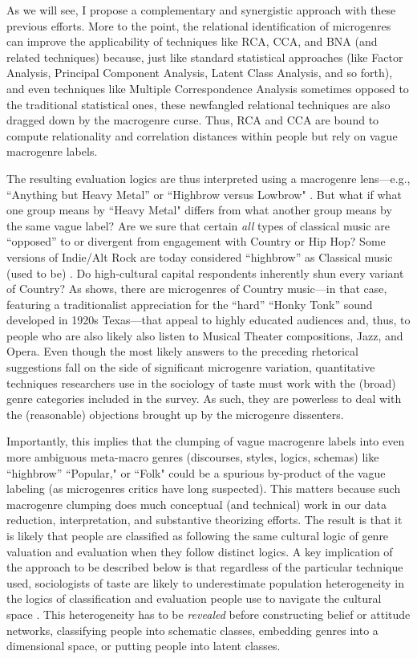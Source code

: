 \documentclass[a4paper,12pt]{extarticle}
\begin{document}
As we will see, I propose a complementary and synergistic approach with these previous efforts. More to the point, the relational identification of microgenres can improve the applicability of techniques like RCA, CCA, and BNA (and related techniques) because, just like standard statistical approaches (like Factor Analysis, Principal Component Analysis, Latent Class Analysis, and so forth), and even techniques like Multiple Correspondence Analysis sometimes opposed to the traditional statistical ones, these newfangled relational techniques are also dragged down by the macrogenre curse. Thus, RCA and CCA are bound to compute relationality and correlation distances within people but rely on vague macrogenre labels. 

The resulting evaluation logics are thus interpreted using a macrogenre lens---e.g., ``Anything but Heavy Metal'' or ``Highbrow versus Lowbrow" \citep[e.g.,][]{goldberg2011mapping, willekens2022cultural}. But what if what one group means by ``Heavy Metal" differs from what another group means by the same vague label? Are we sure that certain {\em all} types of classical music are ``opposed'' to or divergent from engagement with Country or Hip Hop? Some versions of Indie/Alt Rock are today considered ``highbrow'' as Classical music (used to be) \citep{Van_Poecke2018}. Do high-cultural capital respondents inherently shun every variant of Country? As \citet{lembo2017three} shows, there are microgenres of Country music---in that case, featuring a traditionalist appreciation for the ``hard'' ``Honky Tonk'' sound developed in 1920s Texas---that appeal to highly educated audiences and, thus, to people who are also likely also listen to Musical Theater compositions, Jazz, and Opera. Even though the most likely answers to the preceding rhetorical suggestions fall on the side of significant microgenre variation, quantitative techniques researchers use in the sociology of taste must work with the (broad) genre categories included in the survey. As such, they are powerless to deal with the (reasonable) objections brought up by the microgenre dissenters. 

Importantly, this implies that the clumping of vague macrogenre labels into even more ambiguous meta-macro genres (discourses, styles, logics, schemas) like ``highbrow'' ``Popular," or ``Folk" could be a spurious by-product of the vague labeling (as microgenres critics have long suspected). This matters because such macrogenre clumping does much conceptual (and technical) work in our data reduction, interpretation, and substantive theorizing efforts. The result is that it is likely that people are classified as following the same cultural logic of genre valuation and evaluation when they follow distinct logics. A key implication of the approach to be described below is that regardless of the particular technique used, sociologists of taste are likely to underestimate population heterogeneity in the logics of classification and evaluation people use to navigate the cultural space \citep{lahire2008individual}. This heterogeneity has to be {\em revealed} before constructing belief or attitude networks, classifying people into schematic classes, embedding genres into a dimensional space, or putting people into latent classes.
\end{document}
